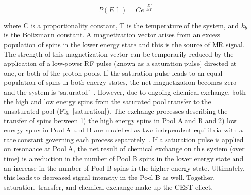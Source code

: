 \begin{equation*}
P(E\uparrow) = Ce^{\frac{-E\uparrow}{k_b T}}
\end{equation*}

where C is a proportionality constant, T is the temperature of the system, and $k_b$ is the Boltzmann constant.
A magnetization vector arises from an excess population of spins in the lower energy state and this is the source of MR signal.
The strength of this magnetization vector can be temporarily reduced by the application of a low-power RF pulse (known as a saturation pulse) directed at one, or both of the proton pools.
If the saturation pulse leads to an equal population of spins in both energy states, the net magnetization becomes zero and the system is `saturated'~\cite{Sherry:2008jg}.
However, due to ongoing chemical exchange, both the high and low energy spins from the saturated pool transfer to the unsaturated pool (Fig~\ref{saturation}).
The exchange processes describing the transfer of spins between 1) the high energy spins in Pool A and B and 2) low energy spins in Pool A and B are modelled as two independent equilibria with a rate constant governing each process separately~\cite{Woods:2006cq}.
If a saturation pulse is applied on resonance at Pool A, the net result of chemical exchange on this system (over time) is a reduction in the number of Pool B spins in the lower energy state and an increase in the number of Pool B spins in the higher energy state.
Ultimately, this leads to decreased signal intensity in the Pool B as well.
Together, saturation, transfer, and chemical exchange make up the CEST effect.


